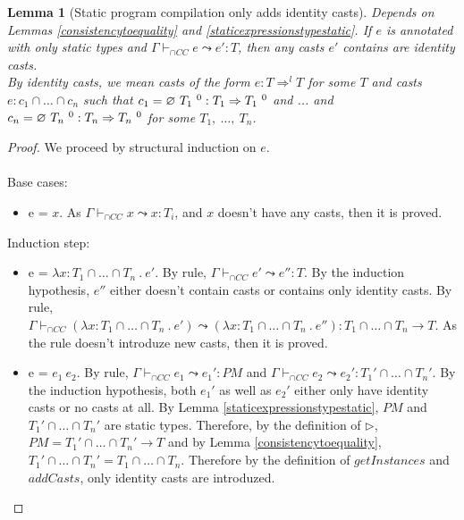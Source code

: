 \documentclass[a4paper]{article}
\newtheorem{lemma}{Lemma}
\begin{document}
\begin{lemma}[Static program compilation only adds identity casts]
\label{staticcompilation}
Depends on Lemmas \ref{consistencytoequality} and \ref{staticexpressionstypestatic}.
If $e$ is annotated with only static types and $\Gamma \vdash_{\cap CC} e \leadsto e' : T$, then any casts $e'$ contains are identity casts.\\
By identity casts, we mean casts of the form $e : T \Rightarrow^l T$ for some $T$ and casts $e : c_1 \cap \ldots \cap c_n$ such that $c_1 = \varnothing\ T_1\ ^{0} : T_1 \Rightarrow T_1\ ^{0}$ and ... and $c_n = \varnothing\ T_n\ ^{0} : T_n \Rightarrow T_n\ ^{0}$ for some $T_1,\ \ldots,\ T_n$.
\end{lemma}
\begin{proof}
We proceed by structural induction on $e$.\\\\
Base cases:
\begin{itemize}
    \item e = $x$.
    As $\Gamma \vdash_{\cap CC} x \leadsto x : T_i$, and $x$ doesn't have any casts, then it is proved.
\end{itemize}
Induction step:
\begin{itemize}
    \item e = $\lambda x : T_1 \cap \ldots \cap T_n\ .\ e'$.
    By rule, $\Gamma \vdash_{\cap CC} e' \leadsto e'' : T$.
    By the induction hypothesis, $e''$ either doesn't contain casts or contains only identity casts.
    By rule, $\Gamma \vdash_{\cap CC} (\lambda x : T_1 \cap \ldots \cap T_n\ .\ e') \leadsto (\lambda x : T_1 \cap \ldots \cap T_n\ .\ e'') : T_1 \cap \ldots \cap T_n \rightarrow T$.
    As the rule doesn't introduze new casts, then it is proved.
    \item e = $e_1\ e_2$.
    By rule, $\Gamma \vdash_{\cap CC} e_1 \leadsto e_1' : PM$ and $\Gamma \vdash_{\cap CC} e_2 \leadsto e_2' : T_1' \cap \ldots \cap T_n'$.
    By the induction hypothesis, both $e_1'$ as well as $e_2'$ either only have identity casts or no casts at all.
    By Lemma \ref{staticexpressionstypestatic}, $PM$ and $T_1' \cap \ldots \cap T_n'$ are static types.
    Therefore, by the definition of $\rhd$, $PM = T_1' \cap \ldots \cap T_n' \rightarrow T$ and by Lemma \ref{consistencytoequality}, $T_1' \cap \ldots \cap T_n' = T_1 \cap \ldots \cap T_n$.
    Therefore by the definition of $getInstances$ and $addCasts$, only identity casts are introduzed.
\end{itemize}
\end{proof}
\end{document}
